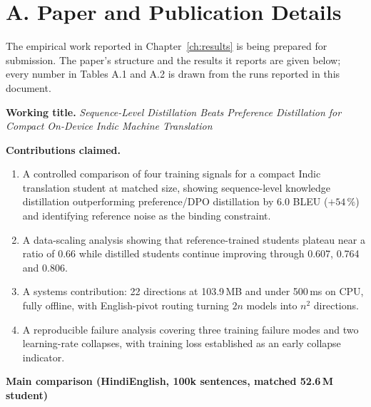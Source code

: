 \clearpage
\thispagestyle{plain}

\section*{A. Paper and Publication Details}

The empirical work reported in Chapter~\ref{ch:results} is being prepared for
submission. The paper's structure and the results it reports are given below; every
number in Tables A.1 and A.2 is drawn from the runs reported in this document.

\vspace{6pt}
\noindent\textbf{Working title.} \textit{Sequence-Level Distillation Beats
Preference Distillation for Compact On-Device Indic Machine Translation}

\vspace{4pt}
\noindent\textbf{Contributions claimed.}
\begin{enumerate}[leftmargin=0.72in]
  \item A controlled comparison of four training signals for a compact Indic
        translation student at matched size, showing sequence-level knowledge
        distillation outperforming preference/DPO distillation by 6.0 BLEU
        ($+54\,\%$) and identifying reference noise as the binding constraint.
  \item A data-scaling analysis showing that reference-trained students plateau
        near a ratio of 0.66 while distilled students continue improving through
        0.607, 0.764 and 0.806.
  \item A systems contribution: 22 directions at 103.9\,MB and under 500\,ms on
        CPU, fully offline, with English-pivot routing turning $2n$ models into
        $n^2$ directions.
  \item A reproducible failure analysis covering three training failure modes
        and two learning-rate collapses, with training loss established as an
        early collapse indicator.
\end{enumerate}

\vspace{6pt}
\noindent\textbf{Main comparison (Hindi\arrowto{}English, 100k sentences, matched 52.6\,M student)}
\vspace{3pt}


